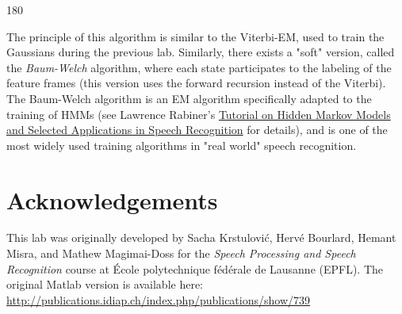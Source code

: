 \documentclass[11pt]{article}
\newenvironment{answer}{\begin{turn}{180}\begin{minipage}[t]{\linewidth}\begin{itshape}}{\end{itshape}\end{minipage}\end{turn}}
\begin{document}
\begin{answer}
\begin{enumerate}
The principle of this algorithm is similar to the Viterbi-EM, used to
train the Gaussians during the previous lab. Similarly, there exists a
"soft" version, called the \emph{Baum-Welch} algorithm, where each state
participates to the labeling of the feature frames (this version uses
the forward recursion instead of the Viterbi). The Baum-Welch
algorithm is an EM algorithm specifically adapted to the training of
HMMs (see Lawrence Rabiner's
\href{http://web.mit.edu/6.435/www/Rabiner89.pdf}{Tutorial on Hidden
Markov Models and Selected Applications in Speech Recognition} for
details), and is one of the most widely used training algorithms in
"real world" speech recognition.
\end{enumerate}
\end{answer}

\section*{Acknowledgements}
\label{sec:org2aa3bb0}
This lab was originally developed by Sacha Krstulović, Hervé
Bourlard, Hemant Misra, and Mathew Magimai-Doss for the \emph{Speech Processing and
Speech Recognition} course at École polytechnique fédérale de Lausanne (EPFL).
The original Matlab version is available here:
\url{http://publications.idiap.ch/index.php/publications/show/739}
\end{document}
